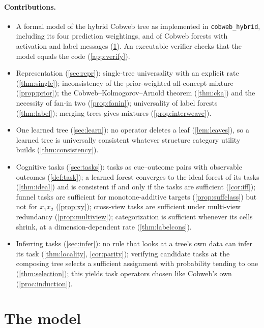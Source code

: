 \documentclass[11pt]{article}
\theoremstyle{definition}
\theoremstyle{remark}
\begin{document}
\paragraph{Contributions.}
\begin{itemize}[leftmargin=*]
\item A formal model of the hybrid Cobweb tree as implemented in
  \texttt{cobweb\_hybrid}, including its four prediction weightings, and of Cobweb
  forests with activation and label messages (\cref{sec:model}).  An executable verifier
  checks that the model equals the code (\cref{app:verify}).
\item Representation (\cref{sec:repr}): single-tree universality with an explicit
  rate (\cref{thm:single}); inconsistency of the prior-weighted all-concept mixture
  (\cref{prop:prior}); the Cobweb--Kolmogorov--Arnold theorem (\cref{thm:cka}) and the
  necessity of fan-in two (\cref{prop:fanin}); universality of label forests
  (\cref{thm:label}); merging trees gives mixtures (\cref{prop:interweave}).
\item One learned tree (\cref{sec:learn}): no operator deletes a leaf
  (\cref{lem:leaves}), so a learned tree is universally consistent whatever structure
  category utility builds (\cref{thm:consistency}).
\item Cognitive tasks (\cref{sec:tasks}): tasks as cue--outcome pairs with observable
  outcomes (\cref{def:task}); a learned forest converges to the ideal forest of its tasks
  (\cref{thm:ideal}) and is consistent if and only if the tasks are sufficient
  (\cref{cor:iff}); funnel tasks are sufficient for monotone-additive targets
  (\cref{prop:suffclass}) but not for $x_1x_2$ (\cref{prop:xy}); cross-view tasks are
  sufficient under multi-view redundancy (\cref{prop:multiview}); categorization is
  sufficient whenever its cells shrink, at a dimension-dependent rate
  (\cref{thm:labelcons}).
\item Inferring tasks (\cref{sec:infer}): no rule that looks at a tree's own data can
  infer its task (\cref{thm:locality}, \cref{cor:parity}); verifying candidate tasks at
  the composing tree selects a sufficient assignment with probability tending to one
  (\cref{thm:selection}); this yields task operators chosen like Cobweb's own
  (\cref{proc:induction}).
\end{itemize}

\section{The model}\label{sec:model}
\end{document}
